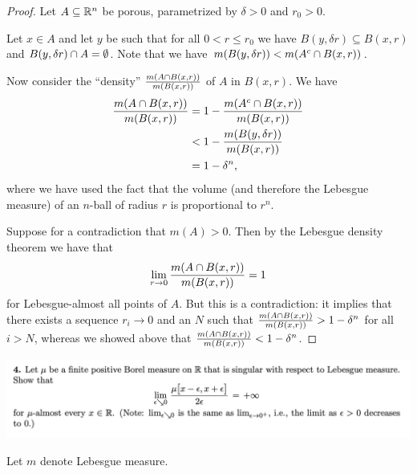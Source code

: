 \begin{proof}
  Let $A \subseteq \mathbb{R}^n$ be porous, parametrized by $\delta > 0$ and $r_0 > 0$.

  Let $x \in A$ and let $y$ be such that for all $0 < r \leq r_0$ we have $B(y, \delta r) \subseteq B(x, r)$
  and $B(y, \delta r) \cap A = \emptyset$. Note that we have $m(B(y, \delta r)) < m(A^c \cap B(x, r))$.

  Now consider the ``density​'' $\frac{m(A \cap B(x, r))}{m(B(x, r))}$ of $A$ in $B(x, r)$. We have
  \begin{align*}
    \frac{m(A \cap B(x, r))}{m(B(x, r))}
    &= 1 - \frac{m(A^c \cap B(x, r))}{m(B(x, r))} \\
    &< 1 - \frac{m(B(y, \delta r))}{m(B(x, r))} \\
    &= 1 - \delta^n,
  \end{align*}
  where we have used the fact that the volume (and therefore the Lebesgue measure) of an $n$-ball of radius $r$
  is proportional to $r^n$.

  Suppose for a contradiction that $m(A) > 0$. Then by the Lebesgue density theorem we have that
  \begin{align*}
    \lim_{r \to 0} \frac{m(A \isect B(x, r))}{m(B(x, r))} = 1
  \end{align*}
  for Lebesgue-almost all points of $A$. But this is a contradiction: it implies that there exists
  a sequence $r_i \to 0$ and an $N$ such
  that $\frac{m(A \cap B(x, r))}{m(B(x, r))} > 1 - \delta^n$ for all $i > N$, whereas we showed
  above that $\frac{m(A \cap B(x, r))}{m(B(x, r))} < 1 - \delta^n$.
\end{proof}



\newpage
\begin{mdframed}
  \includegraphics[width=400pt]{img/analysis--berkeley-202a-final-21a6.png}
\end{mdframed}


Let $m$ denote Lebesgue measure.

